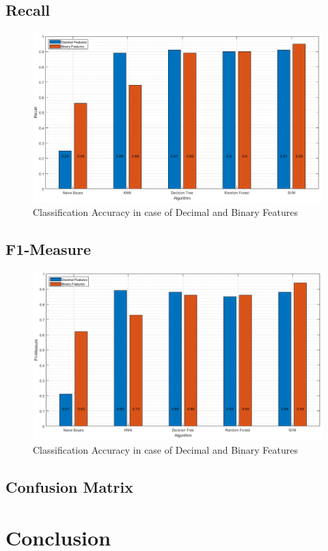 \documentclass{article}
\begin{document}
\subsection{Recall}

\begin{figure}[H]
\centering
\includegraphics[width=\textwidth]{../Figures/recall.png}
\caption{Classification Accuracy in case of Decimal and Binary Features}
\end{figure}

\subsection{F1-Measure}

\begin{figure}[H]
\centering
\includegraphics[width=\textwidth]{../Figures/f1.png}
\caption{Classification Accuracy in case of Decimal and Binary Features}
\end{figure}

\subsection{Confusion Matrix}




\section{Conclusion}


\end{document}
